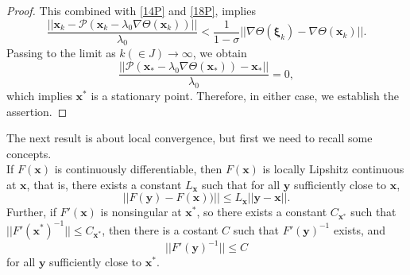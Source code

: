 \begin{proof}
	This combined with \eqref{14P} and \eqref{18P}, implies 
	\begin{equation*}
	\frac{|| \textbf{x}_k - \mathcal{P}(\textbf{x}_k -  \lambda_0 \nabla \Theta (\textbf{x}_k)) ||}{\lambda_0} < \frac{1}{1-\sigma} ||\nabla \Theta (\bm \xi_k)  - \nabla \Theta (\textbf{x}_k)||.
	\end{equation*}
	Passing to the limit as $ k(\in J)\rightarrow \infty $, we obtain 
	\begin{equation*}
	\frac{|| \mathcal{P}(\textbf{x}_* -  \lambda_0 \nabla \Theta (\textbf{x}_*)) - \textbf{x}_* ||}{\lambda_0} = 0,
	\end{equation*}
	which implies $ \textbf{x}^* $ is a stationary point.  Therefore, in either case, we establish the assertion.
\end{proof}
The next result is about local convergence, but first we need to recall some concepts.\\ 
If $ F(\textbf{x}) $ is continuously differentiable, then $ F(\textbf{x}) $ is locally Lipshitz continuous at $ \textbf{x} $, that is, there exists a constant $ L_{\textbf{x}} $ such that for all $ \textbf{y} $
sufficiently close to $ \textbf{x} $, 
\begin{equation*}
||F(\textbf{y}) - F(\textbf{x}))|| \leq L_{\textbf{x}} ||\textbf{y} - \textbf{x}||.
\end{equation*}
Further, if $ F'(\textbf{x}) $ is nonsingular at $ \textbf{x}^* $, so there exists a constant $ C_{\textbf{x}^*} $ such that $ ||F'(\textbf{x}^*)^{-1}|| \leq C_{\textbf{x}^*} $, then there is a costant $ C $ such that $ F'(\textbf{y})^{-1} $ exists, and 
\begin{equation*}
||F'(\textbf{y})^{-1}|| \leq C
\end{equation*}
for all $ \textbf{y} $ sufficiently close to $ \textbf{x}^* $.
